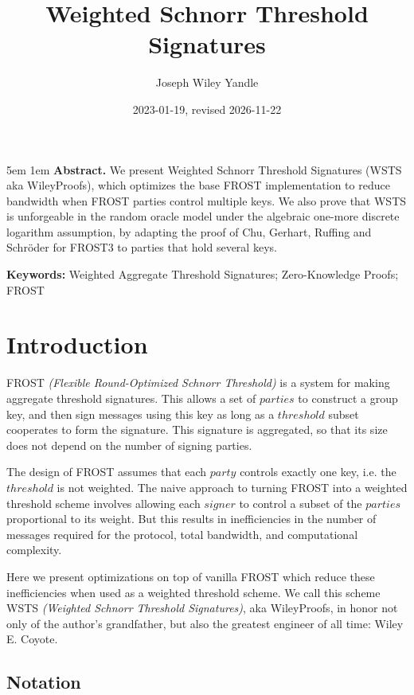 \documentclass{article}
\title{Weighted Schnorr Threshold Signatures}
\date{2023-01-19, revised 2026-11-22}
\author{Joseph Wiley Yandle}
\theoremstyle{plain}
\theoremstyle{definition}
\theoremstyle{remark}
\begin{document}
\onecolumn
\maketitle

\begingroup
\leftskip5em
\parskip1em
\rightskip\leftskip
\noindent\textbf{Abstract.} We present Weighted Schnorr Threshold Signatures (WSTS aka WileyProofs), which optimizes the base FROST implementation to reduce bandwidth when FROST parties control multiple keys.  We also prove that WSTS is unforgeable in the random oracle model under the algebraic one-more discrete logarithm assumption, by adapting the proof of Chu, Gerhart, Ruffing and Schr\"oder for FROST3 to parties that hold several keys.

\par
\noindent\textbf{Keywords:} Weighted Aggregate Threshold Signatures; Zero-Knowledge Proofs; FROST
\par
\endgroup

\section{
  Introduction
}

FROST \emph{(Flexible Round-Optimized Schnorr Threshold)} \cite{frost} is a system for making aggregate threshold signatures.  This allows a set of $parties$ to construct a group key, and then sign messages using this key as long as a $threshold$ subset cooperates to form the signature.  This signature is aggregated, so that its size does not depend on the number of signing parties.

The design of FROST assumes that each $party$ controls exactly one key, i.e. the $threshold$ is not weighted.  The naive approach to turning FROST into a weighted threshold scheme involves allowing each $signer$ to control a subset of the $parties$ proportional to its weight.  But this results in inefficiencies in the number of messages required for the protocol, total bandwidth, and computational complexity.

Here we present optimizations on top of vanilla FROST which reduce these inefficiencies when used as a weighted threshold scheme.  We call this scheme WSTS \emph{(Weighted Schnorr Threshold Signatures)}, aka WileyProofs, in honor not only of the author's grandfather, but also the greatest engineer of all time: Wiley E. Coyote.

\subsection{
  Notation
}
\end{document}
